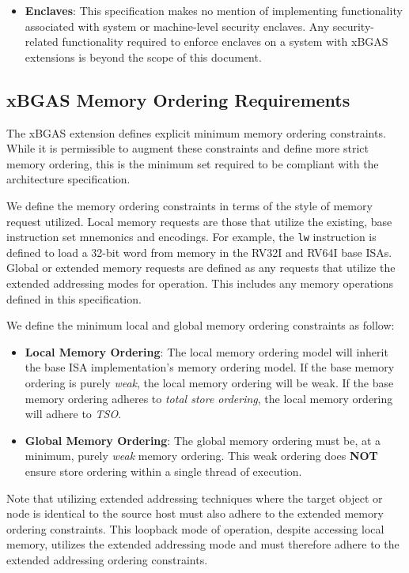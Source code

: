 \documentclass{article}
\begin{document}
\begin{itemize}
\item \textbf{Enclaves}: This specification makes no mention of implementing functionality 
associated with system or machine-level security enclaves.  Any security-related functionality 
required to enforce enclaves on a system with xBGAS extensions is beyond the scope 
of this document.

\end{itemize}

\subsection{xBGAS Memory Ordering Requirements}

The xBGAS extension defines explicit minimum memory ordering constraints.  While it is 
permissible to augment these constraints and define more strict memory ordering, this is the minimum 
set required to be compliant with the architecture specification.

We define the memory ordering constraints in terms of the style of memory request utilized.  Local memory 
requests are those that utilize the existing, base instruction set mnemonics and encodings.  For example, the 
\texttt{lw} instruction is defined to load a 32-bit word from memory in the RV32I and RV64I base ISAs.  Global 
or extended memory requests are defined as any requests that utilize the extended addressing modes for operation.  
This includes any memory operations defined in this specification.  

We define the minimum local and global memory ordering constraints as follow: 

\begin{itemize}
\item \textbf{Local Memory Ordering}: The local memory ordering model will inherit the base ISA implementation's memory ordering 
model.  If the base memory ordering is purely \textit{weak}, the local memory ordering will be weak.  If the base memory ordering adheres 
to \textit{total store ordering}, the local memory ordering will adhere to \textit{TSO}.  

\item \textbf{Global Memory Ordering}: The global memory ordering must be, at a minimum, purely \textit{weak} memory ordering.  This weak 
ordering does \textbf{NOT} ensure store ordering within a single thread of execution.    
\end{itemize}

\begin{commentary}
Note that utilizing extended addressing techniques where the target object or node is identical to the source host must 
also adhere to the extended memory ordering constraints.  This loopback mode of operation, despite accessing local memory, 
utilizes the extended addressing mode and must therefore adhere to the extended addressing ordering constraints.  
\end{commentary}
\end{document}
